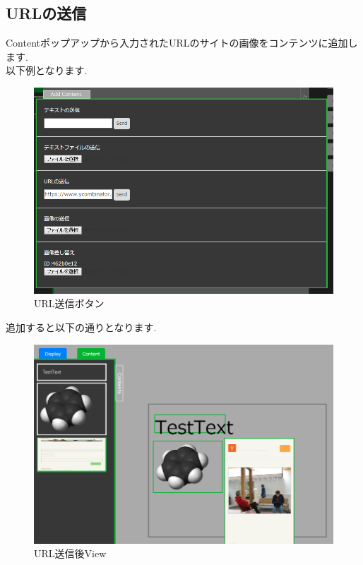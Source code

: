 \documentclass[a4paper,10pt,oneside]{jsbook}
\begin{document}
\newpage



\subsection{URLの送信}
Contentポップアップから入力されたURLのサイトの画像をコンテンツに追加します.\\
以下例となります.\\
\begin{figure}[htbp]
	\begin{center}
		\includegraphics[width=12.5cm]{image/AddContent_URL.PNG}

	\end{center}
	\caption{URL送信ボタン}
	\label{fig:urlsend}
\end{figure}

追加すると以下の通りとなります.\\


\begin{figure}[htbp]
	\begin{center}
		\includegraphics[width=12.5cm]{image/AddContent_URL_View.PNG}
	\end{center}
	\caption{URL送信後View}
	\label{fig:sendurl}
\end{figure}
\end{document}
